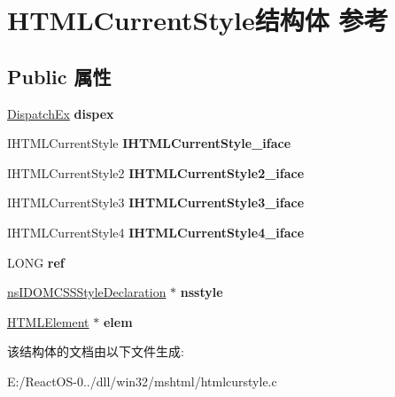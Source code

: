 \hypertarget{struct_h_t_m_l_current_style}{}\section{H\+T\+M\+L\+Current\+Style结构体 参考}
\label{struct_h_t_m_l_current_style}
\subsection*{Public 属性}
\begin{DoxyCompactItemize}
\item 
\mbox{\label{struct_h_t_m_l_current_style_abab2abf1f4c669e72c5d9d82d6107020}} 
\hyperlink{struct_dispatch_ex}{Dispatch\+Ex} {\bfseries dispex}
\item 
\mbox{\label{struct_h_t_m_l_current_style_aa51d8d1bc192adeca1dba9e8c8874a1d}} 
I\+H\+T\+M\+L\+Current\+Style {\bfseries I\+H\+T\+M\+L\+Current\+Style\+\_\+iface}
\item 
\mbox{\label{struct_h_t_m_l_current_style_af43b7d60d514d7db1edbaffe5eafd430}} 
I\+H\+T\+M\+L\+Current\+Style2 {\bfseries I\+H\+T\+M\+L\+Current\+Style2\+\_\+iface}
\item 
\mbox{\label{struct_h_t_m_l_current_style_ad81cba97e135c94f04f7f3ee86dbb715}} 
I\+H\+T\+M\+L\+Current\+Style3 {\bfseries I\+H\+T\+M\+L\+Current\+Style3\+\_\+iface}
\item 
\mbox{\label{struct_h_t_m_l_current_style_aa0f9dd64ba2f8e7ffef8b78cacd9abce}} 
I\+H\+T\+M\+L\+Current\+Style4 {\bfseries I\+H\+T\+M\+L\+Current\+Style4\+\_\+iface}
\item 
\mbox{\label{struct_h_t_m_l_current_style_abfcbc73ba99362d1804c7ba75d268cbb}} 
L\+O\+NG {\bfseries ref}
\item 
\mbox{\label{struct_h_t_m_l_current_style_ae5bccb487ea5aa80747b103be6bd6b85}} 
\hyperlink{interfacens_i_d_o_m_c_s_s_style_declaration}{ns\+I\+D\+O\+M\+C\+S\+S\+Style\+Declaration} $\ast$ {\bfseries nsstyle}
\item 
\mbox{\label{struct_h_t_m_l_current_style_a1829746a1d7ecd68aecd2f0a5fd23ecf}} 
\hyperlink{struct_h_t_m_l_element}{H\+T\+M\+L\+Element} $\ast$ {\bfseries elem}
\end{DoxyCompactItemize}


该结构体的文档由以下文件生成\+:\begin{DoxyCompactItemize}
\item 
E\+:/\+React\+O\+S-\/0../dll/win32/mshtml/htmlcurstyle.\+c\end{DoxyCompactItemize}
